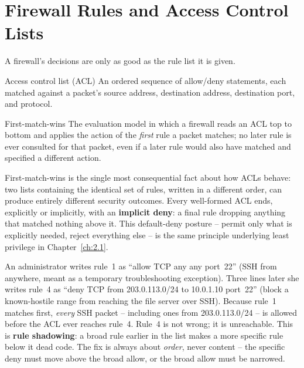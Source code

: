 \section{Firewall Rules and Access Control Lists}

A firewall's decisions are only as good as the rule list it is given.

\begin{definition}{Access control list (ACL)}
An ordered sequence of allow/deny statements, each matched against a packet's source address,
destination address, destination port, and protocol.
\end{definition}

\begin{definition}{First-match-wins}
The evaluation model in which a firewall reads an ACL top to bottom and applies the action of the
\emph{first} rule a packet matches; no later rule is ever consulted for that packet, even if a
later rule would also have matched and specified a different action.
\end{definition}

First-match-wins is the single most consequential fact about how ACLs behave: two lists containing
the identical set of rules, written in a different order, can produce entirely different security
outcomes. Every well-formed ACL ends, explicitly or implicitly, with an \textbf{implicit deny}: a
final rule dropping anything that matched nothing above it. This default-deny posture -- permit
only what is explicitly needed, reject everything else -- is the same principle underlying least
privilege in Chapter~\ref{ch:2.1}.

\begin{example}
An administrator writes rule~1 as ``allow TCP any any port~22'' (SSH from anywhere, meant as a
temporary troubleshooting exception). Three lines later she writes rule~4 as ``deny TCP from
203.0.113.0/24 to 10.0.1.10 port~22'' (block a known-hostile range from reaching the file server
over SSH). Because rule~1 matches first, \emph{every} SSH packet -- including ones from
203.0.113.0/24 -- is allowed before the ACL ever reaches rule~4. Rule~4 is not wrong; it is
unreachable. This is \textbf{rule shadowing}: a broad rule earlier in the list makes a more specific
rule below it dead code. The fix is always about \emph{order}, never content -- the specific deny
must move above the broad allow, or the broad allow must be narrowed.
\end{example}

